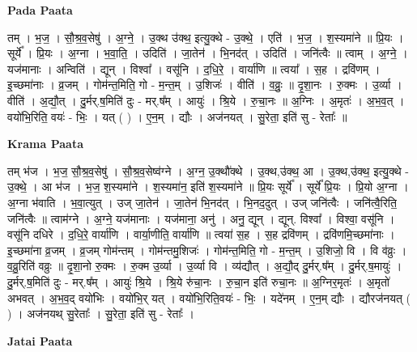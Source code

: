 \documentclass[17pt]{extarticle}
\begin{document}
\textbf{Pada Paata} \newline

तम् । भ॒ज॒ । सौ॒श्र॒व॒सेषु॑ । अ॒ग्ने॒ । उ॒क्थ उ॑क्थ॒ इत्यु॒क्थे - उ॒क्थे॒ । एति॑ । भ॒ज॒ । श॒स्यमा॑ने ॥ प्रि॒यः । सूर्ये᳚ । प्रि॒यः । अ॒ग्ना । भ॒वा॒ति॒ । उदिति॑ । जा॒तेन॑ । भि॒नद॑त् । उदिति॑ । जनि॑त्वैः ॥ त्वाम् । अ॒ग्ने॒ । यज॑मानाः । अन्विति॑ । द्यून् । विश्वा᳚ । वसू॑नि । द॒धि॒रे॒ । वार्या॑णि ॥ त्वया᳚ । स॒ह । द्रवि॑णम् । इ॒च्छमा॑नाः । व्र॒जम् । गोम॑न्त॒मिति॒ गो - म॒न्त॒म् । उ॒शिजः॑ । वीति॑ । व॒व्रुः॒ ॥ दृ॒शा॒नः । रु॒क्मः । उ॒र्व्या । वीति॑ । अ॒द्यौ॒त् । दु॒र्मर्.ष॒मिति॑ दुः - मर्.ष᳚म् । आयुः॑ । श्रि॒ये । रु॒चा॒नः ॥ अ॒ग्निः । अ॒मृतः॑ । अ॒भ॒व॒त् । वयो॑भि॒रिति॒ वयः॑ - भिः॒ । यत् ( ) । ए॒न॒म् । द्यौः । अज॑नयत् । सु॒रेता॒ इति॑ सु - रेताः᳚ ॥  \newline


\textbf{Krama Paata} \newline

तम् भ॑ज । भ॒ज॒ सौ॒श्र॒व॒सेषु॑ । सौ॒श्र॒व॒सेष्व॑ग्ने । अ॒ग्न॒ उ॒क्थौ॑क्थे । उ॒क्थ,उ॑क्थ॒ आ । उ॒क्थ,उ॑क्थ॒ इत्यु॒क्थे - उ॒क्थे॒ । आ भ॑ज । भ॒ज॒ श॒स्यमा॑ने । श॒स्यमा॑न॒ इति॑ श॒स्यमा॑ने ॥ प्रि॒यः सूर्ये᳚ । सूर्ये᳚ प्रि॒यः । प्रि॒यो अ॒ग्ना । अ॒ग्ना भ॑वाति । भ॒वा॒त्युत् । उज् जा॒तेन॑ । जा॒तेन॑ भि॒नद॑त् । भि॒नद॒दुत् । उज् जनि॑त्वैः । जनि॑त्वै॒रिति॒ जनि॑त्वैः ॥ त्वाम॑ग्ने । अ॒ग्ने॒ यज॑मानाः । यज॑माना॒ अनु॑ । अनु॒ द्यून् । द्यून्. विश्वा᳚ । विश्वा॒ वसू॑नि । वसू॑नि दधिरे । द॒धि॒रे॒ वार्या॑णि । वार्या॒णीति॒ वार्या॑णि ॥ त्वया॑ स॒ह । स॒ह द्रवि॑णम् । द्रवि॑णमि॒च्छमा॑नाः । इ॒च्छमा॑ना व्र॒जम् । व्र॒जम् गोम॑न्तम् । गोम॑न्तमु॒शिजः॑ । गोम॑न्त॒मिति॒ गो - म॒न्त॒म् । उ॒शिजो॒ वि । वि व॑व्रुः । व॒व्रु॒रिति॑ वव्रुः ॥ दृ॒शा॒नो रु॒क्मः । रु॒क्म उ॒र्व्या । उ॒र्व्या वि । व्य॑द्यौत् । अ॒द्यौ॒द् दु॒र्मर्.ष᳚म् । दु॒र्मर्.ष॒मायुः॑ । दु॒र्मर्.ष॒मिति॑ दुः - मर्.ष᳚म् । आयुः॑ श्रि॒ये । श्रि॒ये रु॑चा॒नः । रु॒चा॒न इति॑ रुचा॒नः ॥ अ॒ग्निर॒मृतः॑ । अ॒मृतो॑ अभवत् । अ॒भ॒व॒द् वयो॑भिः । वयो॑भि॒र् यत् । वयो॑भि॒रिति॒वयः॑ - भिः॒ । यदे॑नम् । ए॒न॒म् द्यौः । द्यौरज॑नयत् ( ) । अज॑नयथ् सु॒रेताः᳚ । 
सु॒रेता॒ इति॑ सु - रेताः᳚ । \newline

\textbf{Jatai Paata} \newline
\end{document}
